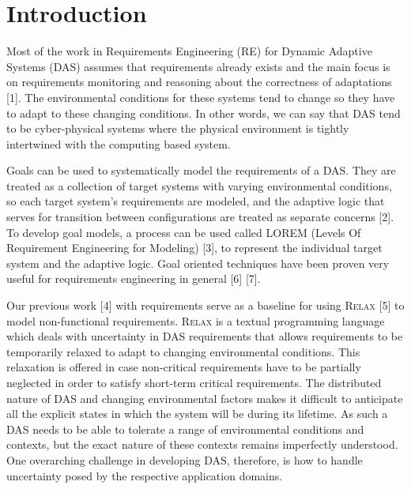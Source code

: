 \documentclass[10pt, conference, compsocconf]{IEEEtran}
\def\myrelax{\textsc{Relax}}                  %
\begin{document}
%
\IEEEpeerreviewmaketitle


\section{Introduction}

Most of the work in Requirements Engineering (RE) for Dynamic Adaptive Systems (DAS) assumes that requirements already exists and the main focus is on requirements monitoring and reasoning about the correctness of adaptations [1]. The environmental conditions for these systems tend to change so they have to adapt to these changing conditions.  In other words, we can say that DAS tend to be cyber-physical systems where the physical environment is tightly intertwined with the computing based system. 

Goals can be used to systematically model the requirements of a DAS. They are treated as a collection of target systems with varying environmental conditions, so each target system's requirements are modeled, and the adaptive logic that serves for transition between configurations are treated as separate concerns [2]. To develop goal models, a process can be used called LOREM (Levels Of Requirement Engineering for Modeling) [3], to represent the individual target system and the adaptive logic. Goal oriented techniques have been proven very useful for requirements engineering in general [6] [7]. 


Our previous work [4] with requirements serve as a baseline for using \myrelax{} [5] to model non-functional requirements. \myrelax{} is a textual programming language which deals with uncertainty in DAS requirements that allows requirements to be temporarily relaxed to adapt to changing environmental conditions. This relaxation is offered in case non-critical requirements have to be partially neglected in order to satisfy short-term critical requirements. The distributed nature of DAS and changing environmental factors makes it difficult to anticipate all the explicit states in which the system will be during its lifetime. As such a DAS needs to be able to tolerate a range of environmental conditions and contexts, but the exact nature of these contexts remains imperfectly understood. One overarching challenge in developing DAS, therefore, is how to handle uncertainty posed by the respective application domains. 
\end{document}
